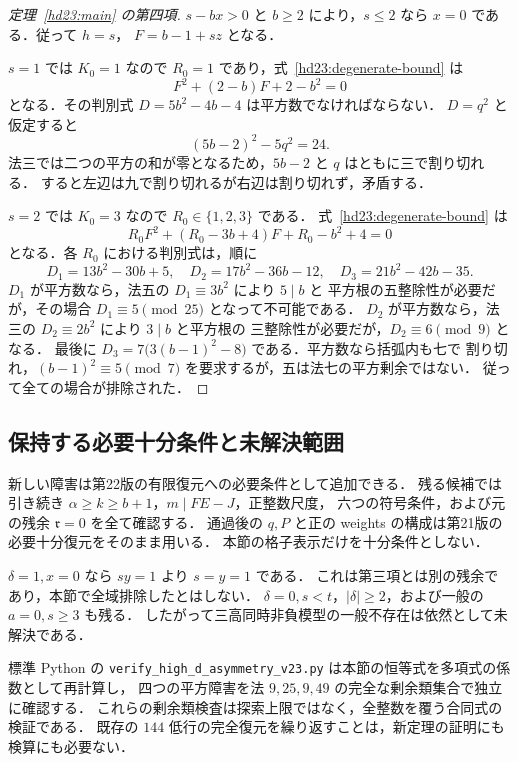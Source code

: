 \begin{proof}[定理~\ref{hd23:main} の第四項]
$s-bx>0$ と $b\ge2$ により，$s\le2$ なら $x=0$ である．従って $h=s$，
$F=b-1+sz$ となる．

$s=1$ では $K_0=1$ なので $R_0=1$ であり，式~\eqref{hd23:degenerate-bound} は
\[
 F^2+(2-b)F+2-b^2=0
\]
となる．その判別式 $D=5b^2-4b-4$ は平方数でなければならない．
$D=q^2$ と仮定すると
\[
 (5b-2)^2-5q^2=24.
\]
法三では二つの平方の和が零となるため，$5b-2$ と $q$ はともに三で割り切れる．
すると左辺は九で割り切れるが右辺は割り切れず，矛盾する．

$s=2$ では $K_0=3$ なので $R_0\in\{1,2,3\}$ である．
式~\eqref{hd23:degenerate-bound} は
\[
 R_0F^2+(R_0-3b+4)F+R_0-b^2+4=0
\]
となる．各 $R_0$ における判別式は，順に
\[
 D_1=13b^2-30b+5,\quad
 D_2=17b^2-36b-12,\quad
 D_3=21b^2-42b-35.
\]
$D_1$ が平方数なら，法五の $D_1\equiv3b^2$ により $5\mid b$ と
平方根の五整除性が必要だが，その場合 $D_1\equiv5\pmod{25}$ となって不可能である．
$D_2$ が平方数なら，法三の $D_2\equiv2b^2$ により $3\mid b$ と平方根の
三整除性が必要だが，$D_2\equiv6\pmod9$ となる．
最後に $D_3=7\bigl(3(b-1)^2-8\bigr)$ である．平方数なら括弧内も七で
割り切れ，$(b-1)^2\equiv5\pmod7$ を要求するが，五は法七の平方剰余ではない．
従って全ての場合が排除された．
\end{proof}

\subsection{保持する必要十分条件と未解決範囲}

新しい障害は第22版の有限復元への必要条件として追加できる．
残る候補では引き続き $\alpha\ge k\ge b+1$，$m\mid FE-J$，正整数尺度，
六つの符号条件，および元の残余 $\mathfrak r=0$ を全て確認する．
通過後の $q,P$ と正の weights の構成は第21版の必要十分復元をそのまま用いる．
本節の格子表示だけを十分条件としない．

$\delta=1,x=0$ なら $sy=1$ より $s=y=1$ である．
これは第三項とは別の残余であり，本節で全域排除したとはしない．
$\delta=0,s<t$，$|\delta|\ge2$，および一般の $a=0,s\ge3$ も残る．
したがって三高同時非負模型の一般不存在は依然として未解決である．

標準 Python の
\nolinkurl{verify_high_d_asymmetry_v23.py}
は本節の恒等式を多項式の係数として再計算し，
四つの平方障害を法 $9,25,9,49$ の完全な剰余類集合で独立に確認する．
これらの剰余類検査は探索上限ではなく，全整数を覆う合同式の検証である．
既存の $144$ 低行の完全復元を繰り返すことは，新定理の証明にも検算にも必要ない．
